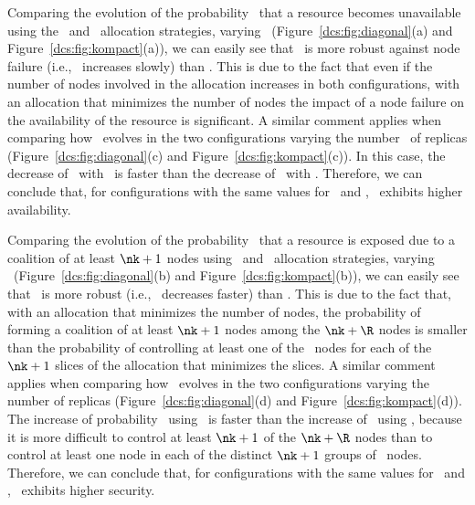 Comparing the evolution of the probability \PF\ that a resource
becomes unavailable using the \diagonal\ and \compact\ allocation
strategies, varying \nk\ (Figure~\ref{dcs:fig:diagonal}(a) and
Figure~\ref{dcs:fig:kompact}(a)), we can easily see that \diagonal\ is
more robust against node failure (i.e., \PF\ increases slowly) than
\compact. This is due to the fact that even if the number of nodes
involved in the allocation increases in both configurations, with an
allocation that minimizes the number of nodes the impact of a node
failure on the availability of the resource is significant. A similar
comment applies when comparing how \PF\ evolves in the two
configurations varying the number \nr\ of replicas
(Figure~\ref{dcs:fig:diagonal}(c) and Figure~\ref{dcs:fig:kompact}(c)). In
this case, the decrease of \PF\ with \diagonal\ is faster than the
decrease of \PF\ with \compact. Therefore, we can conclude that, for
configurations with the same values for \R\ and \K,
\diagonal\ exhibits higher availability.

Comparing the evolution of the probability \PC\ that a resource is
exposed due to a coalition of at least $\nk+1$ nodes using
\diagonal\ and \compact\ allocation strategies, varying
\nk\ (Figure~\ref{dcs:fig:diagonal}(b) and Figure~\ref{dcs:fig:kompact}(b)),
we can easily see that \compact\ is more robust (i.e., \PC\ decreases
faster) than \diagonal. This is due to the fact that, with an
allocation that minimizes the number of nodes, the probability of
forming a coalition of at least $\nk+1$ nodes among the $\nk+\R$ nodes
is smaller than the probability of controlling at least one of the
\R\ nodes for each of the $\nk+1$ slices of the allocation that
minimizes the slices. A similar comment applies when comparing how
\PC\ evolves in the two configurations varying the number of replicas
(Figure~\ref{dcs:fig:diagonal}(d) and Figure~\ref{dcs:fig:kompact}(d)). The
increase of probability \PC\ using \diagonal\ is faster than the
increase of \PC\ using \compact, because it is more difficult to
control at least $\nk+1$ of the $\nk+\R$ nodes than to control at
least one node in each of the distinct $\nk+1$ groups of
\R\ nodes. Therefore, we can conclude that, for configurations with
the same values for \R\ and \K, \compact\ exhibits higher security.


